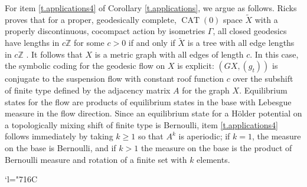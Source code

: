 \documentclass[JEP,XML,SOM,Unicode,NoFloatCountersInSection]{cedram}
\newcommand{\Changelback}{\mathcode`l="716C}
\theoremstyle{definition}
\numberwithin{equation}{section}
\DeclareMathOperator{\CAT}{CAT}
\begin{document}
For item \eqref{t.applications4} of Corollary \ref{t.applications}, we argue as follows. Ricks proves that for a proper, geodesically complete, $\CAT(0)$ space $\tilde X$ with a properly discontinuous, cocompact action by isometries $\Gamma$, all closed geodesics have lengths in $c\mathbb{Z}$ for some $c>0$ if and only if $\tilde X$ is a tree with all edge lengths in $c\mathbb{Z}$ \cite[Th.\,4]{ricks}. It follows that $X$ is a metric graph with all edges of length $c$. In this case, the symbolic coding for the geodesic flow on $X$ is explicit: $(GX, (g_t))$ is conjugate to the suspension flow with constant roof function $c$ over the subshift of finite type defined by the adjacency matrix $A$ for the graph $X$. Equilibrium states for the flow are products of equilibrium states in the base with Lebesgue measure in the flow direction. Since an equilibrium state for a Hölder potential on a topologically mixing shift of finite type is Bernoulli, item \eqref{t.applications4} follows immediately by taking $k\geq 1$ so that $A^k$ is aperiodic; if $k=1$, the measure on the base is Bernoulli, and if $k>1$ the measure on the base is the product of Bernoulli measure and rotation of a finite set with $k$ elements.

\Changelback
\backmatter


\end{document}
